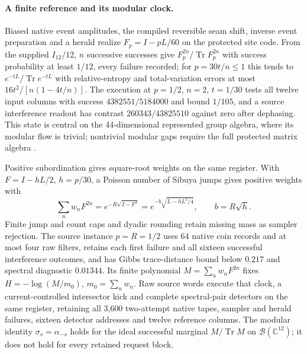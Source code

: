 \documentclass[11pt]{article}
\theoremstyle{definition}
\theoremstyle{remark}
\theoremstyle{plain}
\newcommand{\Tr}{\operatorname{Tr}}
\begin{document}
\paragraph{A finite reference and its modular clock.}
Biased native event amplitudes, the compiled reversible seam shift, inverse
event preparation and a herald realize $F_p=I-pL/60$ on the protected site
code. From the supplied $I_{12}/12$, $n$ successive successes give
$F_p^{2n}/\Tr F_p^{2n}$ with success probability at least $1/12$, every
failure recorded; for $p=30t/n\le1$ this tends to $e^{-tL}/\Tr e^{-tL}$
with relative-entropy and total-variation errors at most
$16t^2/[n(1-4t/n)]$. The execution at $p=1/2$, $n=2$, $t=1/30$ tests all
twelve input columns with success $4382551/5184000$ and bound $1/105$, and a
source interference readout has contrast $260343/43825510$ against zero after
dephasing. This state is central on the 44-dimensional represented group
algebra, where its modular flow is trivial; nontrivial modular gaps require
the full protected matrix algebra \cite{nativePredictions}.

Positive subordination gives square-root weights on the same register. With
$F=I-hL/2$, $h=p/30$, a Poisson number of Sibuya jumps gives positive
weights with
\[
 \sum_n w_nF^{2n}=e^{-R\sqrt{I-F^2}}=e^{-b\sqrt{L-hL^2/4}},\qquad b=R\sqrt h .
\]
Finite jump and count caps and dyadic rounding retain missing mass as sampler
rejection. The source instance $p=R=1/2$ uses 64 native coin records and at
most four raw filters, retains each first failure and all sixteen successful
interference outcomes, and has Gibbs trace-distance bound below $0.217$ and
spectral diagnostic $0.01344$. Its finite polynomial $M=\sum_nw_nF^{2n}$
fixes $H=-\log(M/m_0)$, $m_0=\sum_nw_n$. Raw source words execute that clock,
a current-controlled intersector kick and complete spectral-pair detectors on
the same register, retaining all 3,600 two-attempt native tapes, sampler and
herald failures, sixteen detector addresses and twelve reference columns.
The modular identity $\sigma_s=\alpha_{-s}$ holds for the ideal successful
marginal $M/\Tr M$ on $\mathcal B(\mathbb C^{12})$; it does not hold for
every retained request block.
\end{document}
